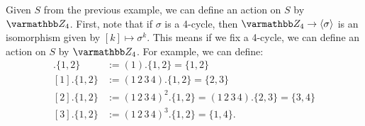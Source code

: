 \begin{example}
	Given $S$ from the previous example, we can define an action on $S$ by $\bfZ_4$. First, note that if $\sigma$ is a 4-cycle, then $\bfZ_4 \rightarrow \left<\sigma \right>$ is an isomorphism given by $[k] \mapsto \sigma^k$. This means if we fix a 4-cycle, we can define an action on $S$ by $\bfZ_4$. For example, we can define:
	\begin{align*}
		[0].\{1,2\} &:= (1).\{1,2\} = \{1,2\} \\
		[1].\{1,2\} &:= (1\,2\,3\,4).\{1,2\} = \{2,3\} \\
		[2].\{1,2\} &:= (1\,2\,3\,4)^2.\{1,2\} = (1\,2\,3\,4).\{2,3\} = \{3,4\} \\
		[3].\{1,2\} &:= (1\,2\,3\,4)^3.\{1,2\} = \{1,4\}.
	\end{align*}
\end{example}


